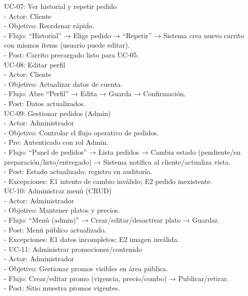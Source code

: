 \documentclass{article}
\begin{document}
\begin{doublespace}
    UC-07: Ver historial y repetir pedido\\
    - Actor: Cliente\\
    - Objetivo: Reordenar rápido.\\
    - Flujo: “Historial” → Elige pedido → “Repetir” → Sistema crea nuevo carrito con mismos ítems (usuario puede editar).\\
    - Post: Carrito precargado listo para UC-05.\\
    
    UC-08: Editar perfil\\
    - Actor: Cliente\\
    - Objetivo: Actualizar datos de cuenta.\\
    - Flujo: Abre “Perfil” → Edita → Guarda → Confirmación.\\
    - Post: Datos actualizados.\\

    UC-09: Gestionar pedidos (Admin)\\
    - Actor: Administrador\\
    - Objetivo: Controlar el flujo operativo de pedidos.\\
    - Pre: Autenticado con rol Admin.\\
    - Flujo: “Panel de pedidos” → Lista pedidos → Cambia estado (pendiente/en preparación/listo/entregado) → Sistema notifica al cliente/actualiza vista.\\
    - Post: Estado actualizado; registro en auditoría.\\
    - Excepciones: E1 intento de cambio inválido; E2 pedido inexistente.\\

    UC-10: Administrar menú (CRUD)\\
    - Actor: Administrador\\
    - Objetivo: Mantener platos y precios.\\
    - Flujo: “Menú (admin)” → Crear/editar/desactivar plato → Guardar.\\
    - Post: Menú público actualizado.\\
    - Excepciones: E1 datos incompletos; E2 imagen inválida.\\
    - UC-11: Administrar promociones/contenido\\
    - Actor: Administrador\\
    - Objetivo: Gestionar promos visibles en área pública.\\
    - Flujo: Crear/editar promo (vigencia, precio/combo) → Publicar/retirar.\\
    - Post: Sitio muestra promos vigentes.\\


\end{doublespace}
\end{document}
